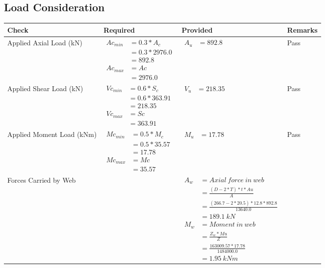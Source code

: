 \documentclass{article}%
\begin{document}
\subsection{Load Consideration}%
\label{subsec:LoadConsideration}%
\renewcommand{\arraystretch}{1.2}%
\begin{longtable}{|p{4cm}|p{3.5cm}|p{6.5cm}|p{1.5cm}|}%
\hline%
\rowcolor{OsdagGreen}%
Check&Required&Provided&Remarks\\%
\hline%
\endhead%
\hline%
Applied Axial Load (kN)&$\begin{aligned} Ac_{min} &= 0.3 * A_c\\ &= 0.3 *2976.0\\ &=892.8\\ Ac_{max} &= Ac \\ &=2976.0\end{aligned}$&$\begin{aligned} A_u &=892.8\end{aligned}$&Pass\\%
\hline%
Applied Shear Load (kN)&$\begin{aligned} Vc_{min} &= 0.6 * S_c\\ &= 0.6 *363.91\\ &=218.35\\ Vc_{max} &= Sc \\ &=363.91\end{aligned}$&$\begin{aligned} V_u &=218.35\end{aligned}$&Pass\\%
\hline%
Applied Moment Load (kNm)&$\begin{aligned} Mc_{min} &= 0.5 * M_c\\ &= 0.5 *35.57\\ &=17.78\\  Mc_{max} &= Mc \\ &=35.57\end{aligned}$&$\begin{aligned} M_u &=17.78\end{aligned}$&Pass\\%
\hline%
Forces Carried by Web&&$\begin{aligned}A_w &= Axial~ force~ in~ web  \\   &= \frac{(D- 2*T)*t* Au }{A} \\ &= \frac{(266.7- 2*20.5)*12.8*892.8 }{13640.0} \\ &=189.1~ kN\\ M_w &= Moment ~in ~web  \\  &= \frac{Z_w * Mu}{Z} \\ &= \frac{163009.57 * 17.78}{1484000.0} \\ &=1.95~{kNm}\end{aligned}$&\\%

\end{longtable}
\end{document}

